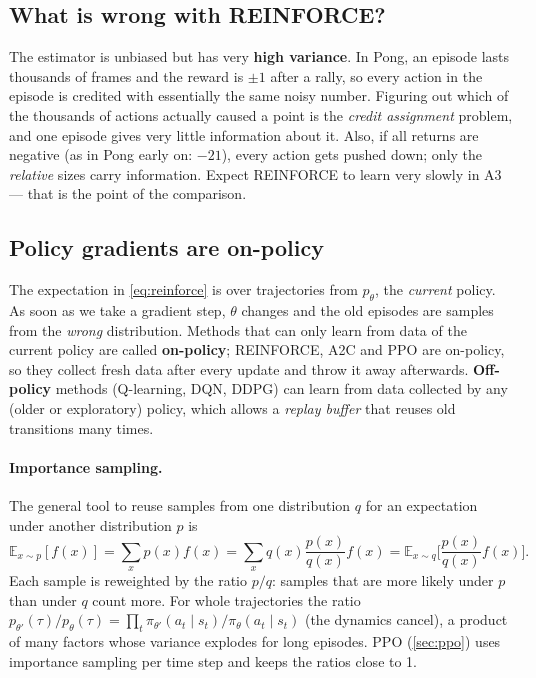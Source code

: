 \documentclass[11pt,a4paper]{article}
\newcommand{\E}{\mathbb{E}}
\newcommand{\pit}{\pi_\theta}
\begin{document}
\subsection{What is wrong with REINFORCE?}
The estimator is unbiased but has very \textbf{high variance}. In Pong, an episode lasts thousands of frames and the reward is $\pm1$ after a rally, so every action in the episode is credited with essentially the same noisy number. Figuring out which of the thousands of actions actually caused a point is the \emph{credit assignment} problem, and one episode gives very little information about it.
Also, if all returns are negative (as in Pong early on: $-21$), every action gets pushed down; only the \emph{relative} sizes carry information.
Expect REINFORCE to learn very slowly in A3 --- that is the point of the comparison.

\subsection{Policy gradients are on-policy}\label{sec:onpolicy}
The expectation in \eqref{eq:reinforce} is over trajectories from $p_\theta$, the \emph{current} policy. As soon as we take a gradient step, $\theta$ changes and the old episodes are samples from the \emph{wrong} distribution. Methods that can only learn from data of the current policy are called \textbf{on-policy}; REINFORCE, A2C and PPO are on-policy, so they collect fresh data after every update and throw it away afterwards. \textbf{Off-policy} methods (Q-learning, DQN, DDPG) can learn from data collected by any (older or exploratory) policy, which allows a \emph{replay buffer} that reuses old transitions many times.

\paragraph{Importance sampling.} The general tool to reuse samples from one distribution $q$ for an expectation under another distribution $p$ is
\begin{equation}
  \E_{x\sim p}[f(x)] = \sum_x p(x)f(x) = \sum_x q(x)\frac{p(x)}{q(x)}f(x) = \E_{x\sim q}\Big[\frac{p(x)}{q(x)}f(x)\Big].
\end{equation}
Each sample is reweighted by the ratio $p/q$: samples that are more likely under $p$ than under $q$ count more. For whole trajectories the ratio $p_{\theta'}(\tau)/p_\theta(\tau)=\prod_t\pi_{\theta'}(a_t\mid s_t)/\pit(a_t\mid s_t)$ (the dynamics cancel), a product of many factors whose variance explodes for long episodes. PPO (\cref{sec:ppo}) uses importance sampling per time step and keeps the ratios close to 1.
\end{document}
